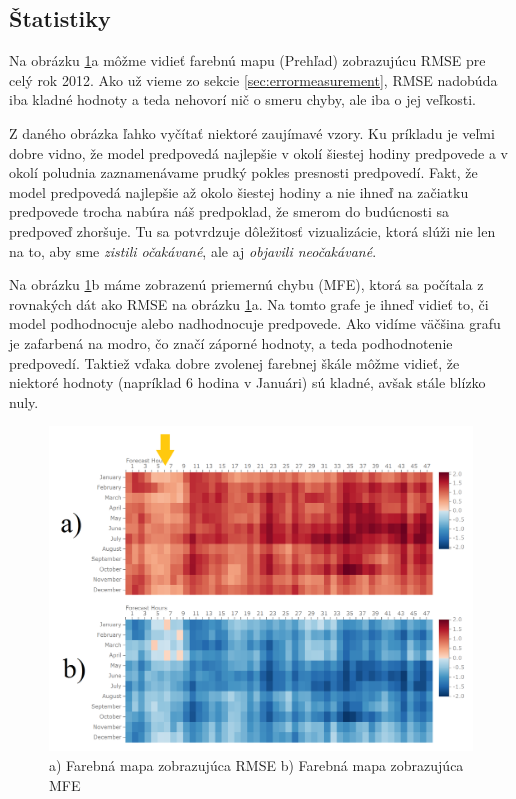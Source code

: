 \subsection{Štatistiky}
Na obrázku \ref{fig:overview}a môžme vidieť farebnú mapu (Prehľad) zobrazujúcu RMSE pre celý rok 2012. Ako už vieme zo sekcie \ref{sec:errormeasurement}, RMSE nadobúda iba kladné hodnoty a teda nehovorí nič o smeru chyby, ale iba o jej veľkosti. 

Z daného obrázka ľahko vyčítať niektoré zaujímavé vzory. Ku príkladu je veľmi dobre vidno, že model predpovedá najlepšie v okolí šiestej hodiny predpovede a v okolí poludnia zaznamenávame prudký pokles presnosti predpovedí. Fakt, že model predpovedá najlepšie až okolo šiestej hodiny a nie ihneď na začiatku predpovede trocha nabúra náš predpoklad, že smerom do budúcnosti sa predpoveď zhoršuje. Tu sa potvrdzuje dôležitosť vizualizácie, ktorá slúži nie len na to, aby sme \textit{zistili očakávané}, ale aj \textit{objavili neočakávané}.

Na obrázku \ref{fig:overview}b máme zobrazenú priemernú chybu (MFE), ktorá sa počítala z rovnakých dát ako RMSE na obrázku \ref{fig:overview}a. Na tomto grafe je ihneď vidieť to, či model podhodnocuje alebo nadhodnocuje predpovede. Ako vidíme väčšina grafu je zafarbená na modro, čo značí záporné hodnoty, a teda podhodnotenie predpovedí. Taktiež vďaka dobre zvolenej farebnej škále môžme vidieť, že niektoré hodnoty (napríklad 6 hodina v Januári) sú kladné, avšak stále blízko nuly.

\begin{figure}
	\centering
	\includegraphics[width = 5in]{overview}
	\caption{a) Farebná mapa zobrazujúca RMSE b) Farebná mapa zobrazujúca MFE}
	\label{fig:overview} 
\end{figure}

